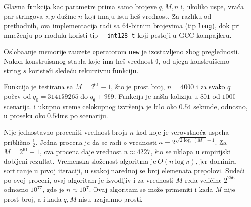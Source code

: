 \noindent
\begin{minipage}[l]{\textwidth}

\end{minipage}

Glavna funkcija kao parametre prima samo brojeve $q,M,n$ i, ukoliko uspe, vra\' ca par stringova $s,p$ du\v zine $n$ koji imaju istu he\v s vrednost. Za razliku od prethodnih, ova implementacija radi sa 64-bitnim brojevima (tip \texttt{long}), dok pri mno\v zenju po modulu koristi tip \texttt{\_\_int128\_t} koji postoji u GCC kompajleru.

\noindent
\begin{minipage}[l]{\textwidth}

\end{minipage}

Osloba\dj anje memorije zauzete operatorom \texttt{new} je izostavljeno zbog preglednosti. Nakon konstruisanog stabla koje ima he\v s vrednost $0$, od njega konstrui\v semo string $s$ koriste\' ci slede\' cu rekurzivnu funkciju.

\noindent
\begin{minipage}[l]{\textwidth}

\end{minipage}

Funkcija je testirana sa $M = 2^{61}-1$, \v sto je prost broj, $n = 4000$ i za svako $q$ po\v cev od $q_0 = 314159265$ do $q_0+999$. Funkcija je na\v sla koliziju u $801$ od $1000$ scenarija, i ukupno vreme celokupnog izvr\v senja je bilo oko $0.54$ sekunde, odnosno, u proseku oko $0.54$ms po scenariju.

Nije jednostavno proceniti vrednost broja $n$ kod koje je verovatno\' ca uspeha pribli\v zno $\frac12$. Jedna procena\cite{cfantihash} je da se radi o vrednosti $n = 2^{\sqrt{2\log_2(M)}+1}$. Za $M = 2^{61}-1$, ova procena daje vrednost $n \approx 4227$, \v sto se uklapa u empirijski dobijeni rezultat. Vremenska slo\v zenost algoritma je $O(n \log n)$, jer dominira sortiranje u prvoj iteraciji, u svakoj narednoj se broj elemenata prepolovi. Sude\' ci po ovoj proceni, ovaj algoritam je izvodljiv i za vrednosti $M$ reda veli\v cine $2^{256}$ odnosno $10^{77}$, gde je $n \approx 10^7$. Ovaj algoritam se mo\v ze primeniti i kada $M$ nije prost broj, a i kada $q,M$ nisu uzajamno prosti.


